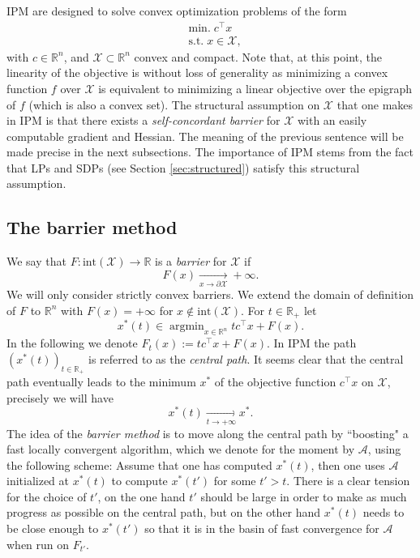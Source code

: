 \documentclass[openany]{now}
\newcommand{\inte}{\mathrm{int}}
\newcommand{\R}{\mathbb{R}}
\newcommand{\cA}{\mathcal{A}}
\newcommand{\cX}{\mathcal{X}}
\newcommand{\argmin}{\mathop{\mathrm{argmin}}}
\begin{document}
IPM are designed to solve convex optimization problems of the form
\begin{align*}
& \mathrm{min.} \; c^{\top} x \\
& \text{s.t.} \; x \in \cX ,
\end{align*}
with $c \in \R^n$, and $\cX \subset \R^n$ convex and compact. 
Note that, at this point, the linearity of the objective is without loss of generality as minimizing a convex function $f$ over $\cX$ is equivalent to minimizing a linear objective over the epigraph of $f$ (which is also a convex set). The structural assumption on $\cX$ that one makes in IPM is that there exists a {\em self-concordant barrier} for $\cX$ with an easily computable gradient and Hessian. The meaning of the previous sentence will be made precise in the next subsections. The importance of IPM stems from the fact that LPs and SDPs (see Section \ref{sec:structured}) satisfy this structural assumption.

\subsection{The barrier method} \label{sec:barriermethod}
We say that $F : \inte(\cX) \rightarrow \R$ is a {\em barrier} for $\cX$ if 
$$F(x) \xrightarrow[x \to \partial \cX]{} +\infty .$$
We will only consider strictly convex barriers. We extend the domain of definition of $F$ to $\R^n$ with $F(x) = +\infty$ for $x \not\in \inte(\cX)$. For $t \in \R_+$ let
$$x^*(t) \in \argmin_{x \in \R^n} t c^{\top} x + F(x) .$$
In the following we denote $F_t(x) := t c^{\top} x + F(x)$.
In IPM the path $(x^*(t))_{t \in \R_+}$ is referred to as the {\em central path}. It seems clear that the central path eventually leads to the minimum $x^*$ of the objective function $c^{\top} x$ on $\cX$, precisely we will have
$$x^*(t) \xrightarrow[t \to +\infty]{} x^* .$$
The idea of the {\em barrier method} is to move along the central path by ``boosting" a fast locally convergent algorithm, which we denote for the moment by $\cA$, using the following scheme: Assume that one has computed $x^*(t)$, then one uses $\cA$ initialized at $x^*(t)$ to compute $x^*(t')$ for some $t'>t$. There is a clear tension for the choice of $t'$, on the one hand $t'$ should be large in order to make as much progress as possible on the central path, but on the other hand $x^*(t)$ needs to be close enough to $x^*(t')$ so that it is in the basin of fast convergence for $\cA$ when run on $F_{t'}$. 
\end{document}
